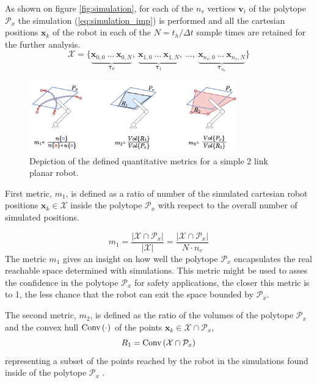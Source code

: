 As shown on figure  \ref{fig:simulation}, for each of the $n_v$ vertices $\bm{v}_i$ of the polytope $\mathcal{P}_x$ the simulation (\ref{eq:simulation_imp}) is performed and all the cartesian positions $\bm{x}_k$ of the robot in each of the $N=t_h/\Delta t$ sample times are retained for the further analysis. $$
\mathcal{X} = \{\underbrace{\bm{x}_{0,0}~\dots ~\bm{x}_{0,N}}_{\bm{\tau}_0},~\underbrace{\bm{x}_{1,0}~\dots~\bm{x}_{1,N}}_{\bm{\tau}_1},~\dots, ~ \underbrace{\bm{x}_{n_v,0}~\dots~\bm{x}_{n_v,N}}_{\bm{\tau}_{n_v}}\}
$$

\begin{figure}[!t]
    \centering
    \includegraphics[width=0.8\textwidth]{Papers/images/metrics.pdf}
    \caption{Depiction of the defined quantitative metrics for a simple 2 link planar robot. }
    \label{fig:metrics_defintition}

\end{figure}


First metric, $m_1$, is defined as a ratio of number of the simulated cartesian robot positions $\bm{x}_k\in \mathcal{X}$ inside the polytope $\mathcal{P}_x$ with respect to the overall number of simulated positions. 

\begin{equation}
    m_1 = \frac{|\mathcal{X}\cap\mathcal{P}_x|}{|\mathcal{X}|} = \frac{|\mathcal{X}\cap\mathcal{P}_x|}{N\cdot n_v}
\end{equation}
The metric $m_1$ gives an insight on how well the polytope $\mathcal{P}_x$ encapsulates the real reachable space determined with simulations. This metric might be used to asses the confidence in the polytope $\mathcal{P}_x$ for safety applications, the closer this metric is to 1, the less chance that the robot can exit the space bounded by $\mathcal{P}_x$.

The second metric, $m_2$, is defined as the ratio of the volumes of the polytope $\mathcal{P}_x$ and the convex hull $\text{Conv}\left(\cdot\right)$ of the points $\bm{x}_k\in\mathcal{X}\cap\mathcal{P}_x$, $$ R_1 = \text{Conv}\left(\mathcal{X}\cap\mathcal{P}_x\right)$$ representing a subset of the points reached by the robot in the simulations found inside of the polytope $\mathcal{P}_x$ .

